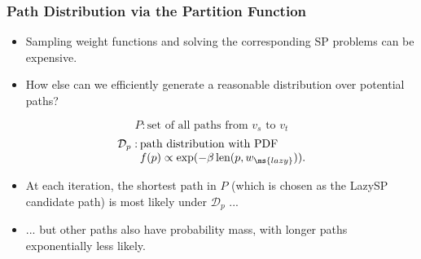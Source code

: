 
\begin{frame}
   \frametitle{Path Distribution via the Partition Function}
   
   \begin{itemize}
   \item
   Sampling weight functions and solving the corresponding SP problems
   can be expensive.
   
   \pause
   \item
   How else can we efficiently generate a reasonable distribution
   over potential paths?
   \end{itemize}
   
   \pause
   \begin{equation*}
      P: \mbox{set of all paths from $v_s$ to $v_t$}
   \end{equation*}%
   \pause%
   \vspace{-0.3cm}
   \begin{equation*}
      \arraycolsep=1pt
      \begin{array}{ll}
      \mathcal{D}_p : & \mbox{path distribution with PDF } \\
      & f(p) \propto \exp( - \beta \, \mbox{len}(p, w_{\ms{lazy}}) ). \\
      \end{array}
   \end{equation*}
   
   \pause
   \vspace{0.3cm}
   \begin{itemize}
   \item At each iteration,
   the shortest path in $P$
   (which is chosen as the LazySP candidate path)
   is most likely under $\mathcal{D}_p$ ...
   
   \pause
   \item ... but other paths also have probability mass,
      with longer paths exponentially less likely.
   \end{itemize}
   
\end{frame}

